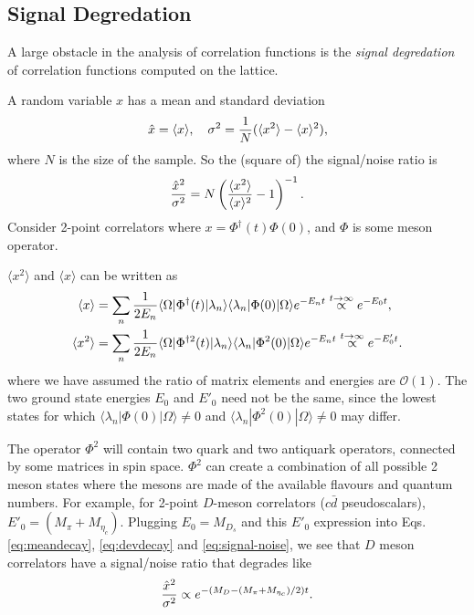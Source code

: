 \subsection{Signal Degredation}
\label{sec:signaldegredation}

A large obstacle in the analysis of correlation functions is the \textit{signal degredation} of correlation functions computed on the lattice.

A random variable $x$ has a mean and standard deviation
\begin{align}
  \hat{x} = \langle x \rangle,\quad
  \sigma^2 = {1\over N} ( \langle x^2 \rangle - \langle x \rangle^2 ),
\end{align}
where $N$ is the size of the sample. So the (square of) the signal/noise ratio is
\begin{align}
  {\hat{x}^2\over \sigma^2} = N \left( {\langle x^2 \rangle \over \langle x \rangle^2} - 1 \right) ^{-1}.
  \label{eq:signal-noise}
\end{align}
Consider 2-point correlators where $x = \Phi^{\dagger}(t) \Phi(0)$, and $\Phi$ is some meson operator.

$\langle x^2 \rangle$ and $\langle x \rangle$ can be written as
\begin{align}
  \label{eq:meandecay}
  \langle x \rangle &= \sum_n {1\over 2E_n} \langle \Omega | \Phi^{\dagger}(t) | \lambda_n \rangle \langle \lambda_n | \Phi(0) | \Omega \rangle e^{-E_n t} \stackrel{t\to\infty}{\propto} e^{-E_0 t}, \\
  \langle x^2 \rangle &= \sum_n {1\over 2E_n} \langle \Omega | \Phi^{\dagger 2}(t) | \lambda_n \rangle \langle \lambda_n | \Phi^2(0) | \Omega \rangle e^{-E_n t} \stackrel{t\to\infty}{\propto} e^{-E'_0 t}.
  \label{eq:devdecay}
\end{align}
where we have assumed the ratio of matrix elements and energies are $\mathcal{O}(1)$. The two ground state energies $E_0$ and $E'_0$ need not be the same, since the lowest states for which $\langle \lambda_n | \Phi(0) | \Omega \rangle \neq 0$ and $\langle \lambda_n | \Phi^2(0) | \Omega \rangle \neq 0$ may differ.

The operator $\Phi^2$ will contain two quark and two antiquark operators, connected by some matrices in spin space. $\Phi^2$ can create a combination of all possible 2 meson states where the mesons are made of the available flavours and quantum numbers. For example, for 2-point $D$-meson correlators ($c\bar{d}$ pseudoscalars), $E'_0 = (M_{\pi}+M_{\eta_c})$. Plugging $E_0=M_{D_s}$ and this $E'_0$ expression into Eqs. \eqref{eq:meandecay}, \eqref{eq:devdecay} and \eqref{eq:signal-noise}, we see that $D$ meson correlators have a signal/noise ratio that degrades like
\begin{align}
  {\hat{x}^2\over \sigma^2} \propto e^{-(M_{D}-(M_{\pi}+M_{\eta_c})/2)t}.
\end{align}

